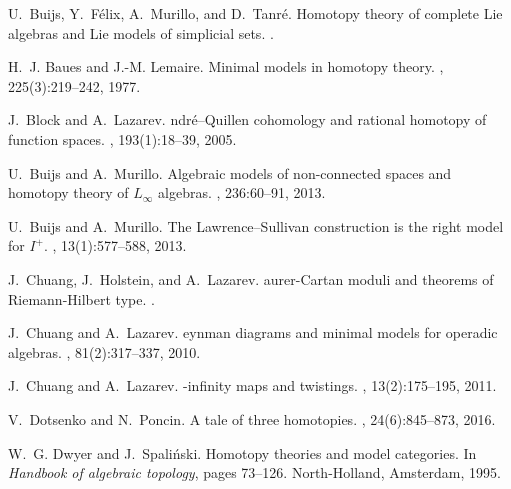 \documentclass[a4paper,reqno]{amsart}
\theoremstyle{plain}
\theoremstyle{definition}
\theoremstyle{remark}
\begin{document}
\begin{thebibliography}{BM13b}

    U.~Buijs, Y.~F{\'e}lix, A.~Murillo, and D.~Tanr{\'e}.
    \newblock Homotopy theory of complete {L}ie algebras and {L}ie models of
    simplicial sets.
    \newblock \href {http://arxiv.org/abs/1601.05331v4}
    {}.

    H.~J. Baues and J.-M. Lemaire.
    \newblock Minimal models in homotopy theory.
    , 225(3):219--242, 1977.
    \newblock

    J.~Block and A.~Lazarev.
    ndr{\'{e}}--{Q}uillen cohomology and rational homotopy of function
    spaces.
    , 193(1):18--39, 2005.
    \newblock

    U.~Buijs and A.~Murillo.
    \newblock Algebraic models of non-connected spaces and homotopy theory of
    {$L_{\infty}$} algebras.
    , 236:60--91, 2013.
    \newblock

    U.~Buijs and A.~Murillo.
    \newblock The {L}awrence--{S}ullivan construction is the right model for
    {$I^+$}.
    , 13(1):577--588, 2013.
    \newblock

    J.~Chuang, J.~Holstein, and A.~Lazarev.
    aurer-{C}artan moduli and theorems of {R}iemann-{H}ilbert type.
    \newblock \href {http://arxiv.org/abs/1802.02549v1}
    {}.

    J.~Chuang and A.~Lazarev.
    eynman diagrams and minimal models for operadic algebras.
    ,
    81(2):317--337, 2010.
    \newblock

    J.~Chuang and A.~Lazarev.
    -infinity maps and twistings.
    , 13(2):175--195, 2011.
    \newblock

    V.~Dotsenko and N.~Poncin.
    \newblock A tale of three homotopies.
    , 24(6):845--873, 2016.
    \newblock

    W.~G. Dwyer and J.~Spali{\'n}ski.
    \newblock Homotopy theories and model categories.
    \newblock In {\em Handbook of algebraic topology}, pages 73--126.
    North-Holland, Amsterdam, 1995.
    \newblock


\end{thebibliography}
\end{document}
